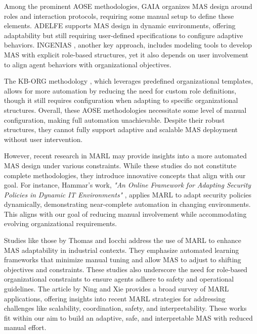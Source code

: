 \documentclass[sigconf,anonymous]{aamas}
\begin{document}
Among the prominent AOSE methodologies, GAIA \cite{gaia1998} organizes MAS design around roles and interaction protocols, requiring some manual setup to define these elements. ADELFE \cite{adelfe2002} supports MAS design in dynamic environments, offering adaptability but still requiring user-defined specifications to configure adaptive behaviors. INGENIAS \cite{ingenias2004}, another key approach, includes modeling tools to develop MAS with explicit role-based structures, yet it also depends on user involvement to align agent behaviors with organizational objectives.

The KB-ORG methodology \cite{kborg2001}, which leverages predefined organizational templates, allows for more automation by reducing the need for custom role definitions, though it still requires configuration when adapting to specific organizational structures. Overall, these AOSE methodologies necessitate some level of manual configuration, making full automation unachievable. Despite their robust structures, they cannot fully support adaptive and scalable MAS deployment without user intervention.

However, recent research in MARL may provide insights into a more automated MAS design under various constraints. While these studies do not constitute complete methodologies, they introduce innovative concepts that align with our goal. For instance, Hammar's work, \emph{"An Online Framework for Adapting Security Policies in Dynamic IT Environments"} \cite{hammar2019}, applies MARL to adapt security policies dynamically, demonstrating near-complete automation in changing environments. This aligns with our goal of reducing manual involvement while accommodating evolving organizational requirements.

Studies like those by Thomas \cite{thomas2023} and Iocchi \cite{iocchi2023} address the use of MARL to enhance MAS adaptability in industrial contexts. They emphasize automated learning frameworks that minimize manual tuning and allow MAS to adjust to shifting objectives and constraints. These studies also underscore the need for role-based organizational constraints to ensure agents adhere to safety and operational guidelines. The article by Ning and Xie \cite{ning2024} provides a broad survey of MARL applications, offering insights into recent MARL strategies for addressing challenges like scalability, coordination, safety, and interpretability. These works fit within our aim to build an adaptive, safe, and interpretable MAS with reduced manual effort.
\end{document}
